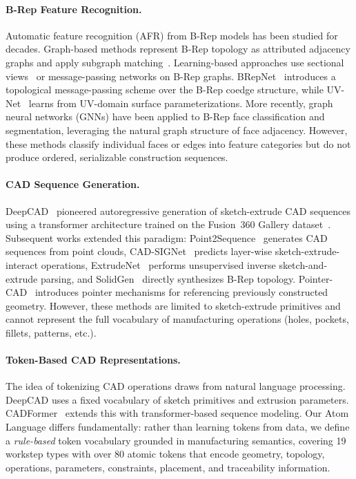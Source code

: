 \documentclass{styles/svproc}
\begin{document}
\paragraph{B-Rep Feature Recognition.}
Automatic feature recognition (AFR) from B-Rep models has been studied for decades. Graph-based methods represent B-Rep topology as attributed adjacency graphs and apply subgraph matching~\cite{mukherjee2001brep}. Learning-based approaches use sectional views~\cite{shi2020brep} or message-passing networks on B-Rep graphs. BRepNet~\cite{lambourne2021brepnet} introduces a topological message-passing scheme over the B-Rep coedge structure, while UV-Net~\cite{jayaraman2021uvnet} learns from UV-domain surface parameterizations. More recently, graph neural networks (GNNs) have been applied to B-Rep face classification and segmentation, leveraging the natural graph structure of face adjacency. However, these methods classify individual faces or edges into feature categories but do not produce ordered, serializable construction sequences.

\paragraph{CAD Sequence Generation.}
DeepCAD~\cite{wu2021deepcad} pioneered autoregressive generation of sketch-extrude CAD sequences using a transformer architecture trained on the Fusion~360 Gallery dataset~\cite{willis2021fusion360}. Subsequent works extended this paradigm: Point2Sequence~\cite{you2022point2sequence} generates CAD sequences from point clouds, CAD-SIGNet~\cite{xiao2022cadsignet} predicts layer-wise sketch-extrude-interact operations, ExtrudeNet~\cite{ren2022extrudenet} performs unsupervised inverse sketch-and-extrude parsing, and SolidGen~\cite{jayaraman2022solidgen} directly synthesizes B-Rep topology. Pointer-CAD~\cite{gong2025pointer} introduces pointer mechanisms for referencing previously constructed geometry. However, these methods are limited to sketch-extrude primitives and cannot represent the full vocabulary of manufacturing operations (holes, pockets, fillets, patterns, etc.).

\paragraph{Token-Based CAD Representations.}
The idea of tokenizing CAD operations draws from natural language processing. DeepCAD uses a fixed vocabulary of sketch primitives and extrusion parameters. CADFormer~\cite{zhang2022cadformer} extends this with transformer-based sequence modeling. Our Atom Language differs fundamentally: rather than learning tokens from data, we define a \emph{rule-based} token vocabulary grounded in manufacturing semantics, covering 19 workstep types with over 80 atomic tokens that encode geometry, topology, operations, parameters, constraints, placement, and traceability information.
\end{document}
